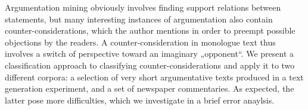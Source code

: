 Argumentation mining obviously involves finding support relations between statements, but many interesting instances of argumentation also contain counter-considerations, which the author mentions in order to preempt possible objections by the readers. A counter-consideration in monologue text thus involves a switch of perspective toward an imaginary „opponent``. We present a classification approach to classifying counter-considerations and apply it to two different corpora: a selection of very short argumentative texts produced in a text generation experiment, and a set of newspaper commentaries. As expected, the latter pose more difficulties, which we investigate in a brief error anaylsis.
